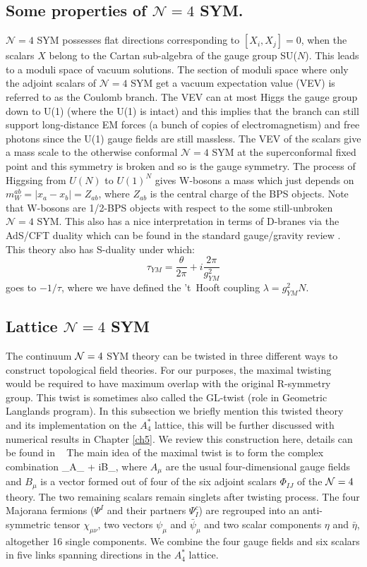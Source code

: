 \subsection{Some properties of $\mathcal{N} = 4$ SYM.} 
 $\mathcal{N} = 4$ SYM possesses flat directions corresponding to $ [X_{i}, X_{j}] = 0$, when the scalars $X$ belong to the 
 Cartan sub-algebra of the gauge group SU($N$). This leads to a moduli space of vacuum solutions. The section of moduli space where only the adjoint scalars of 
 $\mathcal{N} = 4$ SYM get a vacuum expectation value (VEV) is referred to as 
the Coulomb branch. The VEV can at most Higgs the gauge group down to 
U(1) (where the U(1) is intact) and this implies that the branch can still 
support long-distance EM forces (a bunch of copies of electromagnetism) 
and free photons since the U(1) gauge fields are still massless. 
The VEV of the scalars give a mass scale to the otherwise conformal 
$\mathcal{N} = 4$ SYM at the superconformal fixed point
and this symmetry is broken and so is the gauge symmetry. The process of 
Higgsing from $U(N)$ to $U(1)^{N}$ gives W-bosons a mass which 
just depends on $ m_{W}^{ab}  = |x_a - x_b | = Z_{ab} $, where $Z_{ab}$ is the central charge of the BPS objects. 
Note that W-bosons are 1/2-BPS objects with respect to the some still-unbroken $\mathcal{N} = 4$ SYM. 
This also has a nice interpretation in terms of D-branes via the AdS/CFT duality which can be found in the standard 
gauge/gravity review \cite{Aharony:1999ti}. This theory also has S-duality under which:
\[ \tau_{YM} = \frac{\theta}{2\pi} + i \frac{2\pi}{g^{2}_{YM}} \]
goes to $ -1/\tau$, where we have defined the 't~Hooft coupling $ \lambda = g_{YM}^{2} N $. 


\subsection{\label{sec:latticeN4}Lattice  $\mathcal{N} = 4$ SYM}
The continuum $\mathcal N = 4$ SYM theory can be twisted in three different ways to construct topological field theories.
For our purposes, the maximal twisting ~\cite{Marcus:1995mq} would be required to have maximum overlap with the original 
R-symmetry group. This twist is sometimes also called the GL-twist (role in Geometric Langlands program). 
In this subsection we briefly mention this twisted theory and its implementation on the $A_4^*$ lattice, this will be 
further discussed with numerical results in Chapter \ref{ch5}. 
We review this construction here, details can be found in ~\cite{Kaplan:2005ta, Catterall:2009it}
The main idea of the maximal twist is to form the complex combination
\beq
  \label{4dgauge}
  \cA_\mu \equiv A_{\mu} + iB_{\mu},
\eeq
where $A_{\mu}$ are the usual four-dimensional gauge fields and $B_{\mu}$ is a vector formed out of four of the six adjoint scalars $\Phi_{IJ}$ of the $\mathcal N = 4$ theory.
The two remaining scalars remain singlets after twisting process.
The four Majorana fermions ($\Psi^I$ and their partners $\Psi^c_I$) are regrouped into an anti-symmetric tensor $\chi_{\mu\nu}$, 
two vectors $\psi_\mu$ and $\bar{\psi}_{\mu}$ and two scalar components $\eta$ and $\bar{\eta}$, altogether 16 single components.
We combine the four gauge fields and six scalars in five links spanning directions in the $A_{4}^{*}$ lattice. 

